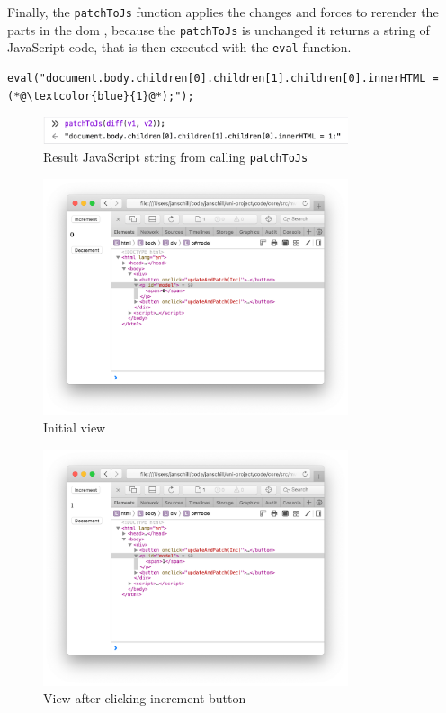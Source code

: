 Finally, the \texttt{patchToJs} function applies the changes and forces to rerender the parts in the \gls{dom}
, because the \texttt{patchToJs} is unchanged it returns a string of JavaScript code, that is then executed with the \texttt{eval} function.



\begin{lstlisting}[columns=fullflexible, label={eval_patch_to_js_result}, language=JaLi, caption=Eval the JavaScript string that patches the view]
eval("document.body.children[0].children[1].children[0].innerHTML = (*@\textcolor{blue}{1}@*);");
\end{lstlisting}

\begin{figure}
    \centering
    \includegraphics[width=0.8\textwidth]{./images/mvu-patch-result}
    \caption{Result JavaScript string from calling \texttt{patchToJs}}
    \label{fig:patch_result_js}
\end{figure}

\begin{figure}
    \centering
    \includegraphics[width=0.8\textwidth]{./images/mvu-patch-js-1}
    \caption{Initial view}
    \label{fig:patch-1_js}
\end{figure}

\begin{figure}
    \centering
    \includegraphics[width=0.8\textwidth]{./images/mvu-patch-js-2}
    \caption{View after clicking increment button}
    \label{fig:patch-2_js}
\end{figure}
